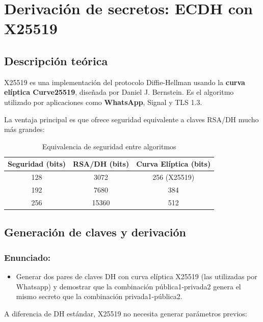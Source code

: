 \section{Derivación de secretos: ECDH con X25519}

\subsection{Descripción teórica}

X25519 es una implementación del protocolo Diffie-Hellman usando la \textbf{curva elíptica Curve25519}, diseñada por Daniel J. Bernstein. Es el algoritmo utilizado por aplicaciones como \textbf{WhatsApp}, Signal y TLS 1.3.

La ventaja principal es que ofrece seguridad equivalente a claves RSA/DH mucho más grandes:

\begin{table}[H]
    \centering
    \caption{Equivalencia de seguridad entre algoritmos}
    \begin{tabularx}{\textwidth}{c|c|c}
        \toprule
        \textbf{Seguridad (bits)} & \textbf{RSA/DH (bits)} & \textbf{Curva Elíptica (bits)} \\
        \midrule
        128 & 3072 & 256 (X25519) \\
        192 & 7680 & 384 \\
        256 & 15360 & 512 \\
        \bottomrule
    \end{tabularx}
\end{table}

\subsection{Generación de claves y derivación}
\subsubsection{Enunciado:}
\begin{itemize}[label=\textbullet]
    \item Generar dos pares de claves DH con curva elíptica X25519 (las utilizadas por Whatsapp) y demostrar que la combinación pública1-privada2 genera el mismo secreto que la combinación privada1-pública2.
\end{itemize}

A diferencia de DH estándar, X25519 no necesita generar parámetros previos:

